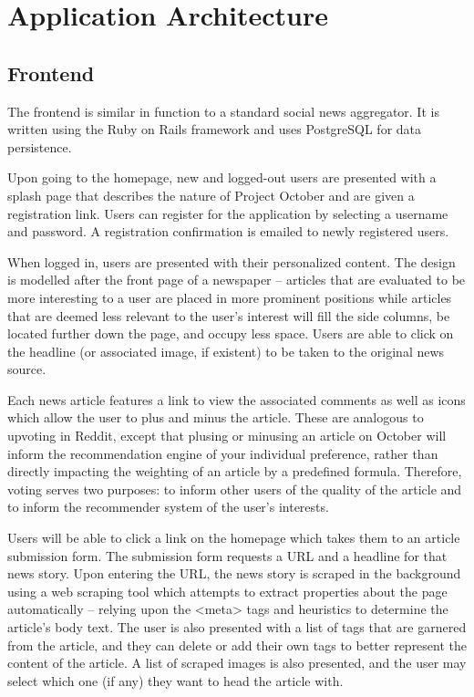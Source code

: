 \documentclass[11pt,letterpaper,titlepage]{article}
\begin{document}
\section{Application Architecture}
\subsection{Frontend}
The frontend is similar in function to a standard social news aggregator.
It is written using the Ruby on Rails framework\cite{rubyonrails} and uses PostgreSQL for data persistence.

Upon going to the homepage, new and logged-out users are presented with a splash page that describes the nature of Project October and are given a registration link.
Users can register for the application by selecting a username and password.
A registration confirmation is emailed to newly registered users.

When logged in, users are presented with their personalized content.
The design is modelled after the front page of a newspaper -- articles that are evaluated to be more interesting to a user are placed in more prominent positions while articles that are deemed less relevant to the user's interest will fill the side columns, be located further down the page, and occupy less space.
Users are able to click on the headline (or associated image, if existent) to be taken to the original news source.

Each news article features a link to view the associated comments as well as icons which allow the user to plus and minus the article.
These are analogous to upvoting in Reddit, except that plusing or minusing an article on October will inform the recommendation engine of your individual preference, rather than directly impacting the weighting of an article by a predefined formula.
Therefore, voting serves two purposes: to inform other users of the quality of the article and to inform the recommender system of the user's interests.

Users will be able to click a link on the homepage which takes them to an article submission form.
The submission form requests a URL and a headline for that news story.
Upon entering the URL, the news story is scraped in the background using a web scraping tool which attempts to extract properties about the page automatically -- relying upon the <meta> tags and heuristics to determine the article's body text. The user is also presented with a list of tags that are garnered from the article, and they can delete or add their own tags to better represent the content of the article. A list of scraped images is also presented, and the user may select which one (if any) they want to head the article with.
\end{document}
